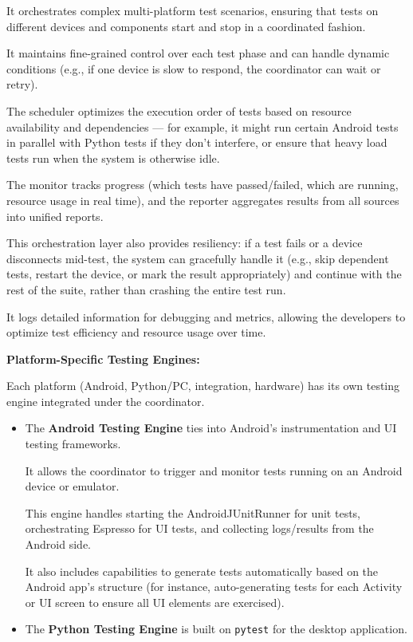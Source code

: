 {{{It orchestrates complex multi-platform test scenarios, ensuring that tests on different devices and components start and stop in a coordinated fashion.

It maintains fine-grained control over each test phase and can handle dynamic conditions (e.g., if one device is slow to respond, the coordinator can wait or retry).

The scheduler optimizes the execution order of tests based on resource availability and dependencies --- for example, it might run certain Android tests in parallel with Python tests if they don't interfere, or ensure that heavy load tests run when the system is otherwise idle.

The monitor tracks progress (which tests have passed/failed, which are running, resource usage in real time), and the reporter aggregates results from all sources into unified reports.

This orchestration layer also provides resiliency: if a test fails or a device disconnects mid-test, the system can gracefully handle it (e.g., skip dependent tests, restart the device, or mark the result appropriately) and continue with the rest of the suite, rather than crashing the entire test run.

It logs detailed information for debugging and metrics, allowing the developers to optimize test efficiency and resource usage over time.

\textbf{Platform-Specific Testing Engines:}

Each platform (Android, Python/PC, integration, hardware) has its own testing engine integrated under the coordinator.

\begin{itemize}
 
\item The \textbf{Android Testing Engine}
 ties into Android's instrumentation and UI testing frameworks.

It allows the coordinator to trigger and monitor tests running on an Android device or emulator.

This engine handles starting the AndroidJUnitRunner for unit tests, orchestrating Espresso for UI tests, and collecting logs/results from the Android side.

It also includes capabilities to generate tests automatically based on the Android app's structure (for instance, auto-generating tests for each Activity or UI screen to ensure all UI elements are exercised).

\item The \textbf{Python Testing Engine}
 is built on \texttt{pytest} for the desktop application.


\end{itemize}}}}
